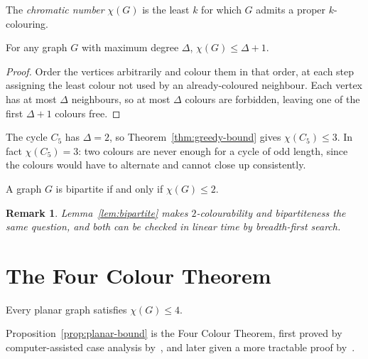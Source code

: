 \documentclass[lang=en,12pt]{beautybook}
\newtheorem*{remark}{\textbf{Remark}}
\begin{document}
\begin{defi}
\label{def:chromatic}
The \emph{chromatic number} $\chi(G)$ is the least $k$ for which $G$
admits a proper $k$-colouring.
\end{defi}

\begin{thm}
\label{thm:greedy-bound}
For any graph $G$ with maximum degree $\Delta$, $\chi(G) \leq \Delta + 1$.
\end{thm}

\begin{proof}
Order the vertices arbitrarily and colour them in that order, at each step
assigning the least colour not used by an already-coloured neighbour.
Each vertex has at most $\Delta$ neighbours, so at most $\Delta$ colours
are forbidden, leaving one of the first $\Delta + 1$ colours free.
\end{proof}

\begin{exam}
\label{exam:cycle}
The cycle $C_5$ has $\Delta = 2$, so Theorem~\ref{thm:greedy-bound} gives
$\chi(C_5) \leq 3$. In fact $\chi(C_5) = 3$: two colours are never enough
for a cycle of odd length, since the colours would have to alternate and
cannot close up consistently.
\end{exam}

\begin{lem}
\label{lem:bipartite}
A graph $G$ is bipartite if and only if $\chi(G) \leq 2$.
\end{lem}

\begin{remark}
Lemma~\ref{lem:bipartite} makes $2$-colourability and bipartiteness the
same question, and both can be checked in linear time by breadth-first
search.
\end{remark}

\chapter{The Four Colour Theorem}
\label{ch:four-colour}

\begin{prop}
\label{prop:planar-bound}
Every planar graph satisfies $\chi(G) \leq 4$.
\end{prop}

Proposition~\ref{prop:planar-bound} is the Four Colour Theorem, first
proved by computer-assisted case analysis
by~\citet{appel1977four}, and later given a more tractable
proof by~\citet{robertson1997four}.





\end{document}
